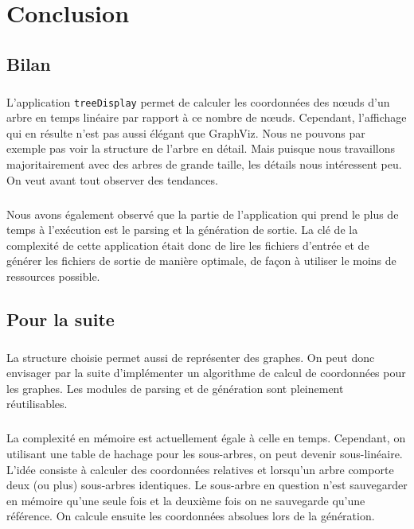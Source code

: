 \chapter{Conclusion}

\section{Bilan}
\paragraph{}L'application \verb|treeDisplay| permet de calculer les coordonnées des n\oe uds d'un arbre en temps linéaire par rapport à ce nombre de n\oe uds. Cependant, l'affichage qui en résulte n'est pas aussi élégant que GraphViz. Nous ne pouvons par exemple pas voir la structure de l'arbre en détail. Mais puisque nous travaillons majoritairement avec des arbres de grande taille, les détails nous intéressent peu. On veut avant tout observer des tendances. 
\paragraph{} Nous avons également observé que la partie de l'application qui prend le plus de temps à l'exécution est le parsing et la génération de sortie. La clé de la complexité de cette application était donc de lire les fichiers d'entrée et de générer les fichiers de sortie de manière optimale, de façon à utiliser le moins de ressources possible.

\section{Pour la suite}

\paragraph{}La structure choisie permet aussi de représenter des graphes. On peut donc envisager par la suite d'implémenter un algorithme de calcul de coordonnées pour les graphes. Les modules de parsing et de génération sont pleinement réutilisables.

\paragraph{}La complexité en mémoire est actuellement égale à celle en temps. Cependant, on utilisant une table de hachage pour les sous-arbres, on peut devenir sous-linéaire. L'idée consiste à calculer des coordonnées relatives et lorsqu'un arbre comporte deux (ou plus) sous-arbres identiques. Le sous-arbre en question n'est sauvegarder en mémoire qu'une seule fois et la deuxième fois on ne sauvegarde qu'une référence. On calcule ensuite les coordonnées absolues lors de la génération.